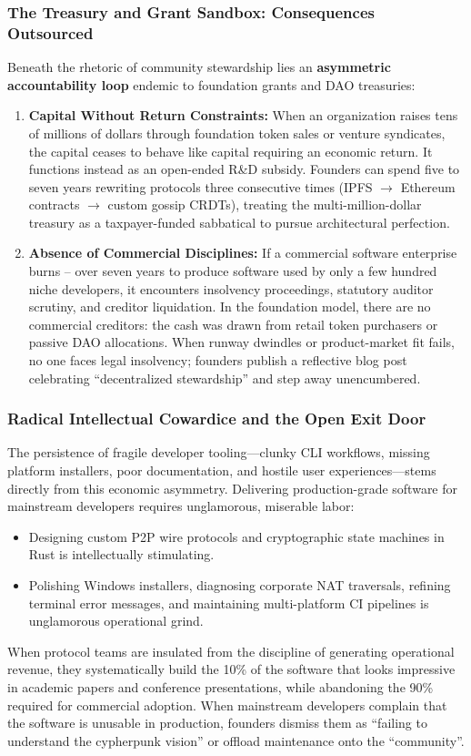 \documentclass[a4paper,11pt,twoside,parskip=half-,headings=small]{scrartcl}
\begin{document}
\subsubsection{The Treasury and Grant Sandbox: Consequences Outsourced}
\label{sec:grant_sandbox}
Beneath the rhetoric of community stewardship lies an \textbf{asymmetric accountability loop} endemic to foundation grants and DAO treasuries:
\begin{enumerate}
  \item \textbf{Capital Without Return Constraints:} When an organization raises tens of millions of dollars through foundation token sales or venture syndicates, the capital ceases to behave like capital requiring an economic return. It functions instead as an open-ended R\&D subsidy. Founders can spend five to seven years rewriting protocols three consecutive times (IPFS $\to$ Ethereum contracts $\to$ custom gossip CRDTs), treating the multi-million-dollar treasury as a taxpayer-funded sabbatical to pursue architectural perfection.
  \item \textbf{Absence of Commercial Disciplines:} If a commercial software enterprise burns -- over seven years to produce software used by only a few hundred niche developers, it encounters insolvency proceedings, statutory auditor scrutiny, and creditor liquidation. In the foundation model, there are no commercial creditors: the cash was drawn from retail token purchasers or passive DAO allocations. When runway dwindles or product-market fit fails, no one faces legal insolvency; founders publish a reflective blog post celebrating ``decentralized stewardship'' and step away unencumbered.
\end{enumerate}

\subsubsection{Radical Intellectual Cowardice and the Open Exit Door}
\label{sec:intellectual_cowardice}
The persistence of fragile developer tooling---clunky CLI workflows, missing platform installers, poor documentation, and hostile user experiences---stems directly from this economic asymmetry. Delivering production-grade software for mainstream developers requires unglamorous, miserable labor:
\begin{itemize}
  \item Designing custom P2P wire protocols and cryptographic state machines in Rust is intellectually stimulating.
  \item Polishing Windows installers, diagnosing corporate NAT traversals, refining terminal error messages, and maintaining multi-platform CI pipelines is unglamorous operational grind.
\end{itemize}
When protocol teams are insulated from the discipline of generating operational revenue, they systematically build the 10\% of the software that looks impressive in academic papers and conference presentations, while abandoning the 90\% required for commercial adoption. When mainstream developers complain that the software is unusable in production, founders dismiss them as ``failing to understand the cypherpunk vision'' or offload maintenance onto the ``community''.
\end{document}
